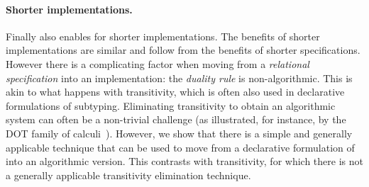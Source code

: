 \paragraph{Shorter implementations.} Finally \nameduo also enables for shorter implementations.
The benefits of shorter implementations are similar and follow from the benefits of shorter specifications.
However there is a complicating factor when moving from a \emph{relational
specification} into an implementation: the \emph{duality rule} is non-algorithmic.
This is akin to what happens with transitivity, which is often also used
in declarative formulations of subtyping. Eliminating transitivity to obtain
an algorithmic system can often be a non-trivial challenge (as illustrated, for instance,
by the DOT family of calculi~\citep{amin2012dependent}). However, we show that there is a simple and
generally applicable technique that can be used to move from a declarative formulation
of \nameduo into an algorithmic version. This contrasts with transitivity,
for which there is not a generally applicable transitivity elimination technique.

\begin{comment}

In summary, the contributions of this paper are:
\begin{itemize}
\item {\textbf{\nameduo}:} A new methodology for the design of subtyping relations
  exploiting duality.

\item {\textbf{A case study on \nameduo}:}
  A comprehensive study of various existing type systems and features,
  which were redesigned to employ the \nameduo methodology. Our results
  show that in most systems the size of the metatheory without duality and
  with duality is comparable, while often transitivity proofs become
  simpler when employing duality.

\item {\textbf{$F_{<:}$ with lower bounded quantification}:} We propose a new generalization of System $F_{<:}$, called $F_{k\diamond}$,
  which allows not only type variables to be quantified with upper bounds
  and lower bounds as well. While this system is weaker than Scala/DOT's
  type bounds, it nonetheless allows for simple transitivity proofs (which
  have been a significant challenge in calculi with type bounds~\cite{rompf2016type}).

\item {\textbf{Mechanization in Coq}:} All the systems in our case study have been formalized in the
  Coq theorem prover~\cite{barras1997coq}. 
\end{itemize}

\end{comment}

